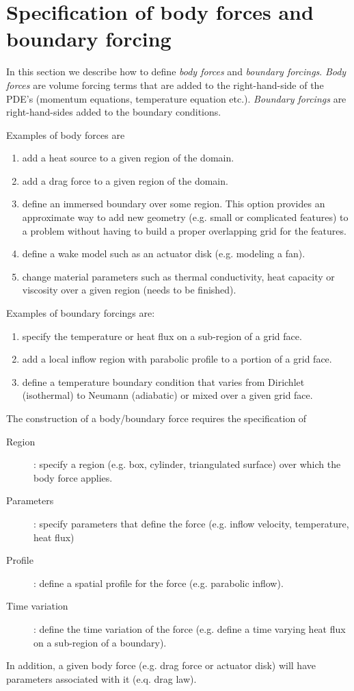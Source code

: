 %
\section{Specification of body forces and boundary forcing} \label{sec:bodyAndBoundaryForcing}


In this section we describe how to define {\em body forces} and {\em boundary forcings}.
{\em Body forces} are volume forcing terms that are added to the right-hand-side of
the PDE's (momentum equations, temperature equation etc.). 
{\em Boundary forcings} are right-hand-sides added to the boundary conditions.

\noindent Examples of body forces are
\begin{enumerate}
   \item add a heat source to a given region of the domain.
   \item add a drag force  to a given region of the domain.
   \item define an immersed boundary over some region. This option provides an approximate way to add 
         new geometry (e.g. small or complicated features) to a problem without having to build a proper overlapping grid 
         for the features.
   \item define a wake model such as an actuator disk (e.g. modeling a fan).
   \item change material parameters such as thermal conductivity, heat capacity or viscosity over a given region (needs to be finished).
\end{enumerate}

\noindent Examples of boundary forcings are:
\begin{enumerate}
   \item specify the temperature or heat flux on a sub-region of a grid face.
   \item add a local inflow region with parabolic profile to a portion of a grid face.
   \item define a temperature boundary condition that varies from Dirichlet (isothermal) to Neumann (adiabatic) or mixed
     over a given grid face.
\end{enumerate}


\noindent The construction of a body/boundary force requires the specification of
\begin{description}
   \item[\quad Region] : specify a region (e.g. box, cylinder, triangulated surface) over which the body force applies.
   \item[\quad Parameters] : specify parameters that define the force (e.g. inflow velocity, temperature, heat flux)
   \item[\quad Profile] : define a spatial profile for the force (e.g. parabolic inflow).
   \item[\quad Time variation] : define the time variation of the force (e.g. define a time varying heat flux on
        a sub-region of a boundary).
\end{description}
In addition, a given body force (e.g. drag force or actuator disk) will have parameters associated with it (e.q. drag law).


